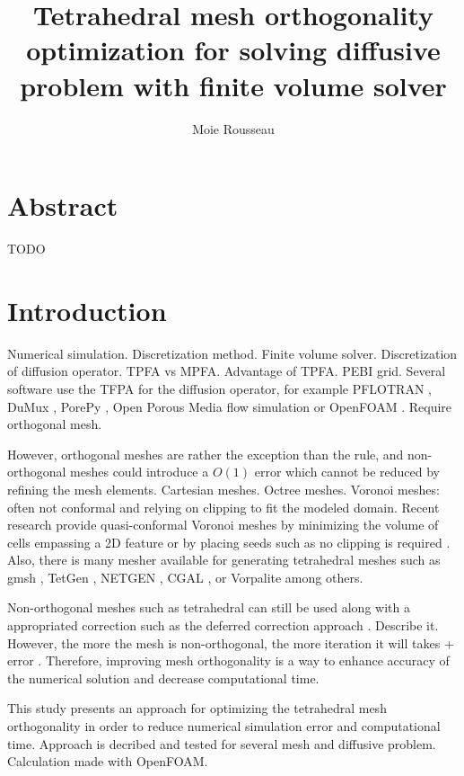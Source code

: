\documentclass[11pt]{article}
\title{\textbf{Tetrahedral mesh orthogonality optimization for solving diffusive problem with finite volume solver}}
\author{Moie Rousseau}
\date{}
\begin{document}
\maketitle
\thispagestyle{empty}

\section*{Abstract}

TODO

\section{Introduction}

Numerical simulation. 
Discretization method. 
Finite volume solver. 
Discretization of diffusion operator.
TPFA vs MPFA. Advantage of TPFA. PEBI grid.
Several software use the TFPA for the diffusion operator, for example PFLOTRAN \cite{hammond_pflotran_2012}, DuMux \cite{koch_dumux_2021}, PorePy \cite{keilegavlen_porepy_2021}, Open Porous Media flow simulation \cite{rasmussen_the_2021} or OpenFOAM \cite{}.
Require orthogonal mesh.

However, orthogonal meshes are rather the exception than the rule, and non-orthogonal meshes could introduce a $O(1)$ error which cannot be reduced by refining the mesh elements.
Cartesian meshes.
Octree meshes.
Voronoi meshes: often not conformal and relying on clipping to fit the modeled domain.
Recent research provide quasi-conformal Voronoi meshes by minimizing the volume of cells empassing a 2D feature \cite{merland_voronoi_2014} or by placing seeds such as no clipping is required \cite{abdelkader_vorocrust_2020}.
Also, there is many mesher available for generating tetrahedral meshes such as gmsh \cite{geuzaine_gmsh_2007}, TetGen \cite{si_tetgen_2015}, NETGEN \cite{schoberl_netgen_1997}, CGAL \cite{}, or Vorpalite \cite{} among others.

Non-orthogonal meshes such as tetrahedral can still be used along with a appropriated correction such as the deferred correction approach \cite{jasak_error_1996, moukalled_finite_2016}.
Describe it.
However, the more the mesh is non-orthogonal, the more iteration it will takes + error \cite{traore_robust_2009}. %
Therefore, improving mesh orthogonality is a way to enhance accuracy of the numerical solution and decrease computational time.

This study presents an approach for optimizing the tetrahedral mesh orthogonality in order to reduce numerical simulation error and computational time.
Approach is decribed and tested for several mesh and diffusive problem.
Calculation made with OpenFOAM.
\end{document}
